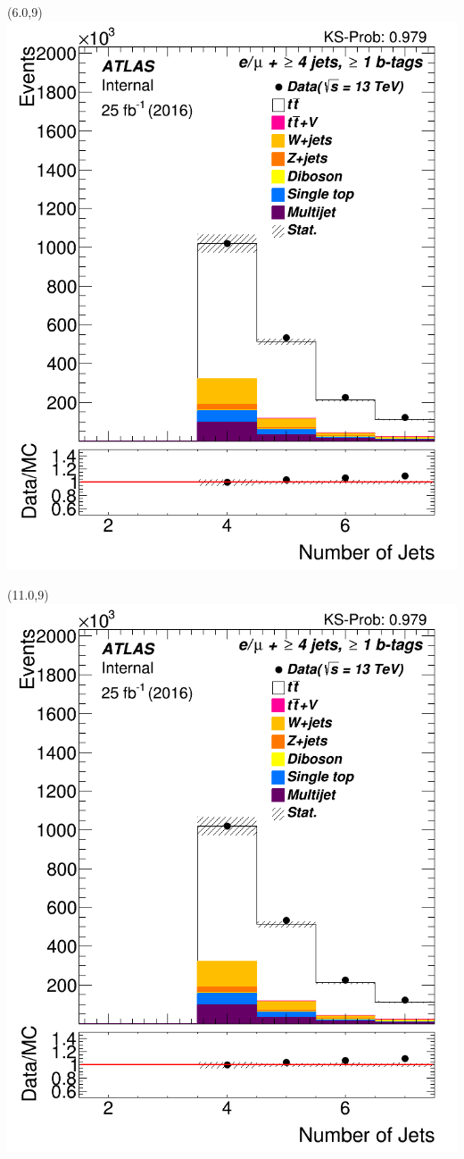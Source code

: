 \documentclass[green,compress,10pt]{beamer}
\begin{document}
{		\begin{textblock}{5}(6.0,9)	
		\includegraphics[width=0.8\linewidth]{PicsTop/1NumberJets.png}
	\end{textblock}

	\begin{textblock}{5}(11.0,9)	
	\includegraphics[width=0.8\linewidth]{PicsTop/1NumberJets.png}
\end{textblock}

}
\end{document}
